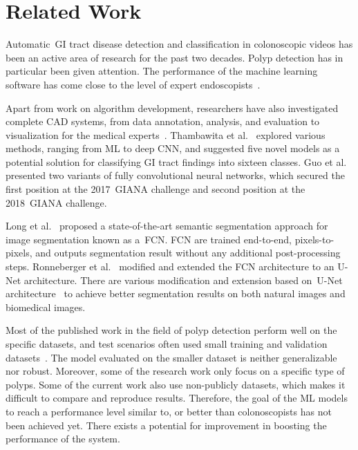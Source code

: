 \documentclass[conference]{IEEEtran}
\begin{document}
\section{Related Work}
\label{section:related_work}

Automatic~\ac{GI} tract disease detection and classification in colonoscopic videos has been an active area of research for the past two decades.
Polyp detection has in particular been given attention.
The performance of the machine learning software has come close to the level of expert endoscopists~\cite{wang2014part,mori2017computer,brandao2018towards,wang2018development}.

Apart from work on algorithm development, researchers have also investigated complete \ac{CAD} systems, from data annotation, analysis, and evaluation to visualization for the medical experts~\cite{wang2015polyp, riegler2017annotation,hicks2018mimir}. Thambawita et al.~\cite{thambawita2018medico} explored various methods, ranging from \ac{ML} to deep \ac{CNN}, and suggested five novel models as a potential solution for classifying \ac{GI} tract findings into sixteen classes. Guo et al.~\cite{guo2019giana} presented two variants of fully convolutional neural networks, which secured the first position at the 2017~\ac{GIANA} challenge and second position at the 2018~\ac{GIANA} challenge. 

Long et al.~\cite{long2015fully} proposed a state-of-the-art semantic segmentation approach for image segmentation known as a~\ac{FCN}. \ac{FCN} are trained end-to-end, pixels-to-pixels, and outputs segmentation result without any additional post-processing steps. Ronneberger et al.~\cite{ronneberger2015u} modified and extended the FCN architecture to an U-Net architecture. There are various modification and extension based on~\mbox{U-Net} architecture~\cite{cciccek20163d,milletari2016v,drozdzal2016importance,zhang2018road,diakogiannis2019resunet,guo2019giana,zhou2018unet++} to achieve better segmentation results on both natural images and biomedical images. 


Most of the published work in the field of polyp detection perform well on the specific datasets, and test scenarios often used small training and validation datasets~\cite{wang2013part,brandao2018towards}. The model evaluated on the smaller dataset is neither generalizable nor robust. Moreover, some of the research work only focus on a specific type of polyps. Some of the current work also use non-publicly datasets, which makes it difficult to compare and reproduce results. Therefore, the goal of the \ac{ML} models to reach a performance level similar to, or better than colonoscopists has not been achieved yet. There exists a potential for improvement in boosting the performance of the system.
\end{document}
